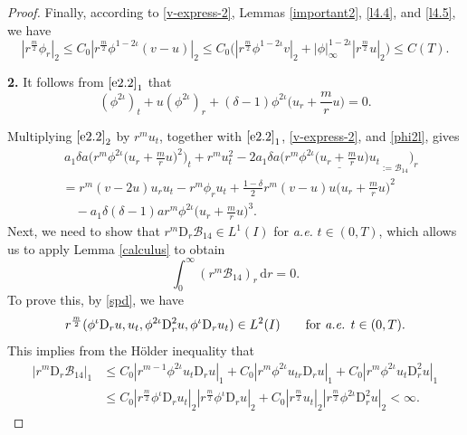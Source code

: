 \documentclass[11pt,reqno]{amsart}
\numberwithin{rk}{section}
\numberwithin{prop}{section}
\numberwithin{mydef}{section}
\numberwithin{lem}{section}
\numberwithin{equation}{section}
\numberwithin{thm}{section}
\begin{document}
\begin{proof}
Finally, according to \eqref{v-express-2},  Lemmas \ref{important2}, \ref{l4.4}, and \ref{l4.5}, we have 
\begin{equation}\label{6.6-1}
|r^{\frac{m}{2}}\phi_r|_2\leq C_0|r^{\frac{m}{2}}\phi^{1-2\iota}(v-u)|_2 \leq C_0 \big(|r^\frac{m}{2}\phi^{1-2\iota} v|_2+|\phi|_\infty^{1-2\iota}|r^{\frac{m}{2}}u|_2\big)\leq C(T).
\end{equation}





\smallskip
\textbf{2.} It follows from $\eqref{e2.2}_1$ that
\begin{equation}\label{phi2l}
(\phi^{2\iota})_t+u(\phi^{2\iota})_r+(\delta-1)\phi^{2\iota}\big(u_r+\frac{m}{r}u\big)=0.
\end{equation}


Multiplying $\eqref{e2.2}_2$ by $r^m u_t$, together with $\eqref{e2.2}_1$, \eqref{v-express-2}, and \eqref{phi2l}, gives
\begin{equation}\label{eq:B9pre}
\begin{aligned}
&\,a_1\delta a \Big(r^m\phi^{2\iota}\big(u_r+ \frac{m}{r}u\big)^2\Big)_t+r^m u_t^2-2a_1 \delta a\Big(r^m \underline{\phi^{2\iota}\big(u_r+ \frac{m}{r}u\big)u_t}_{:=\mathcal{B}_{14}}\Big)_r\\
&= r^m (v-2u) u_ru_t -r^m\phi_ru_t +\frac{1-\delta}{2} r^m (v-u)u\big(u_r+ \frac{m}{r}u\big)^2\\
&\quad-a_1\delta(\delta-1) a r^m\phi^{2\iota}\big(u_r+ \frac{m}{r}u\big)^3.    
\end{aligned}    
\end{equation}
Next, we need to  show that $r^m \mathrm{D}_r\mathcal{B}_{14} \in L^1(I)$ for {\it a.e.} $t\in (0,T)$, which allows us to apply Lemma \ref{calculus} to obtain
\begin{equation}\label{eq:B9}
\int_0^\infty (r^m\mathcal{B}_{14})_r\,\mathrm{d}r =0.
\end{equation}
To prove this, by \eqref{spd}, we have 
\begin{equation*}
r^\frac{m}{2}(\phi^\iota\mathrm{D}_r u,u_t,\phi^{2\iota}\mathrm{D}_r^2 u,\phi^\iota \mathrm{D}_r u_t)\in L^2(I)  \qquad \text{for {\it a.e.} $t\in (0,T)$}.
\end{equation*}
This implies from the H\"older inequality that 
\begin{equation*}
\begin{aligned}
|r^m \mathrm{D}_r\mathcal{B}_{14}|_1&\leq C_0 |r^{m-1}\phi^{2\iota} u_t \mathrm{D}_r u|_1+C_0 |r^{m}\phi^{2\iota}u_{tr}\mathrm{D}_r u|_1+C_0 |r^{m}\phi^{2\iota}u_{t}\mathrm{D}_r^2 u|_1\\
&\leq C_0 |r^\frac{m}{2}\phi^{\iota}\mathrm{D}_r u_t|_2 |r^\frac{m}{2}\phi^{\iota}\mathrm{D}_r u|_2+C_0|r^\frac{m}{2}u_t|_2 |r^\frac{m}{2}\phi^{2\iota}\mathrm{D}_r^2 u|_2<\infty.
\end{aligned}
\end{equation*}



\end{proof}
\end{document}

